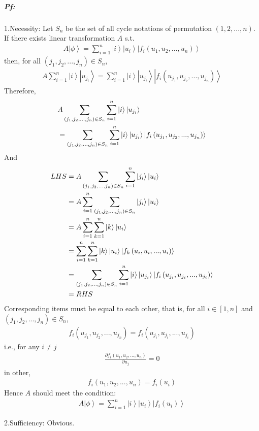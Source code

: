 \documentclass[%
 reprint,
 amsmath,amssymb,
pra,
]{revtex4-1}
\begin{document}
\subparagraph{Pf:} 1.Necessity: Let $S_n$ be the set of all cycle notations of permutation $\left(1, 2, ..., n\right)$. If there exists linear transformation $A$ s.t. 
\begin{align*}
	A\left|\phi\right\rangle = \sum_{i=1}^n \left|i\right\rangle\left|u_i\right\rangle\left|f_{i}\left(u_1, u_2, ..., u_n\right)\right\rangle
\end{align*}
then, for all $\left(j_1, j_2, ..., j_n\right)\in S_n$, 
\begin{align*}
	A\sum_{i=1}^n \left|i\right\rangle\left|u_{j_i}\right\rangle = \sum_{i=1}^n \left|i\right\rangle\left|u_{j_i}\right\rangle\left|f_{i}\left(u_{j_1}, u_{j_2}, ..., u_{j_n}\right)\right\rangle
\end{align*}
Therefore,  
\begin{align*}
	&A\sum_{\left(j_1, j_2, ..., j_n\right)\in S_n}\sum_{i=1}^n \left|i\right\rangle\left|u_{j_i}\right\rangle \notag\\
	&=\sum_{\left(j_1, j_2, ..., j_n\right)\in S_n}\sum_{i=1}^n\left|i\right\rangle\left|u_{j_i}\right\rangle\left|f_{i}\left(u_{j_1}, u_{j_2}, ..., u_{j_n}\right)\right\rangle
\end{align*}
And
\begin{align*}
	LHS &= A\sum_{\left(j_1, j_2, ..., j_n\right)\in S_n}\sum_{i=1}^n \left|j_i\right\rangle\left|u_i\right\rangle\notag\\
	&= A\sum_{i=1}^n\sum_{\left(j_1, j_2, ..., j_n\right)\in S_n}\left|j_i\right\rangle\left|u_i\right\rangle\notag\\
	&= A\sum_{i=1}^n\sum_{k=1}^n\left|k\right\rangle\left|u_i\right\rangle \notag\\
	&= \sum_{i=1}^n\sum_{k=1}^n\left|k\right\rangle\left|u_i\right\rangle\left|f_{k}\left(u_i, u_i, ..., u_i\right)\right\rangle\notag\\
	&= \sum_{\left(j_1, j_2, ..., j_n\right)\in S_n}\sum_{i=1}^n\left|i\right\rangle\left|u_{j_i}\right\rangle\left|f_{i}\left(u_{j_i}, u_{j_i}, ..., u_{j_i}\right)\right\rangle\notag\\
	&= RHS
\end{align*}
Corresponding items must be equal to each other, that is, for all $i \in \left[1, n\right]$ and $\left(j_1, j_2, ..., j_n\right)\in S_n$, 
\begin{align*}
	f_{i}\left(u_{j_1}, u_{j_2}, ..., u_{j_n}\right) = f_{i}\left(u_{j_i}, u_{j_i}, ..., u_{j_i}\right)
\end{align*}
i.e., for any $i\neq j$
\begin{align*}
	\frac{\partial f_i\left(u_1, u_2, ..., u_n\right)}{\partial u_j} = 0
\end{align*}
in other, 
\begin{align*}
	f_i\left(u_1, u_2, ...,u_n\right) = f_i\left(u_i\right)
\end{align*}
Hence $A$ should meet the condition: 
\begin{align*}
	A\left|\phi\right\rangle = \sum_{i=1}^n \left|i\right\rangle\left|u_i\right\rangle\left|f_{i}\left(u_i\right)\right\rangle
\end{align*}

2.Sufficiency: Obvious.


\end{document}
